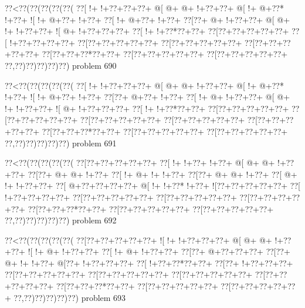 \vbox{\vbox{\goo
\0??<\0??(\0??(\0??(\0??(\0??(
\0??[\- !+\- !+\0??+\0??+\0??+
\- @[\- @+\- @+\- !+\0??+\0??+
\- @[\- !+\- @+\0??*\- !+\0??+
\- ![\- !+\- @+\0??+\- !+\0??+
\0??[\- !+\- @+\0??+\- !+\0??+
\0??[\0??+\- @+\- !+\0??+\0??+
\- @[\- @+\- !+\- !+\0??+\0??+
\- ![\- @+\- !+\0??+\0??+\0??+
\0??[\- !+\- !+\0??*\0??+\0??+
\0??[\0??+\0??+\0??+\0??+\0??+
\0??[\- !+\0??+\0??+\0??+\0??+
\0??[\0??+\0??+\0??+\0??+\0??+
\0??[\0??+\0??+\0??+\0??+\0??+
\0??[\0??+\0??+\0??+\0??+\0??+
\0??[\0??+\0??+\0??*\0??+\0??+
\0??[\0??+\0??+\0??+\0??+\0??+
\0??[\0??+\0??+\0??+\0??+\0??+
\0??,\0??)\0??)\0??)\0??)\0??)
}
\hfil problem 690\hfil\break
}

\vbox{\vbox{\goo
\0??<\0??(\0??(\0??(\0??(\0??(
\0??[\- !+\- !+\0??+\0??+\0??+
\- @[\- @+\- @+\- !+\0??+\0??+
\- @[\- !+\- @+\0??*\- !+\0??+
\- ![\- !+\- @+\0??+\- !+\0??+
\0??[\0??+\- @+\0??+\- !+\0??+
\0??[\- !+\- @+\- !+\0??+\0??+
\- @[\- @+\- !+\- !+\0??+\0??+
\- ![\- @+\- !+\0??+\0??+\0??+
\0??[\- !+\- !+\0??*\0??+\0??+
\0??[\0??+\0??+\0??+\0??+\0??+
\0??[\0??+\0??+\0??+\0??+\0??+
\0??[\0??+\0??+\0??+\0??+\0??+
\0??[\0??+\0??+\0??+\0??+\0??+
\0??[\0??+\0??+\0??+\0??+\0??+
\0??[\0??+\0??+\0??*\0??+\0??+
\0??[\0??+\0??+\0??+\0??+\0??+
\0??[\0??+\0??+\0??+\0??+\0??+
\0??,\0??)\0??)\0??)\0??)\0??)
}
\hfil problem 691\hfil\break
}

\vbox{\vbox{\goo
\0??<\0??(\0??(\0??(\0??(\0??(
\0??[\0??+\0??+\0??+\0??+\0??+
\0??[\- !+\- !+\0??+\- !+\0??+
\- @[\- @+\- @+\- !+\0??+\0??+
\0??[\0??+\- @+\- @+\- !+\0??+
\0??[\- !+\- @+\- !+\- !+\0??+
\0??[\0??+\- @+\- @+\- !+\0??+
\0??[\- @+\- !+\- !+\0??+\0??+
\0??[\- @+\0??+\0??+\0??+\0??+
\- @[\- !+\- !+\0??*\- !+\0??+
\- ![\0??+\0??+\0??+\0??+\0??+
\0??[\- !+\0??+\0??+\0??+\0??+
\0??[\0??+\0??+\0??+\0??+\0??+
\0??[\0??+\0??+\0??+\0??+\0??+
\0??[\0??+\0??+\0??+\0??+\0??+
\0??[\0??+\0??+\0??*\0??+\0??+
\0??[\0??+\0??+\0??+\0??+\0??+
\0??[\0??+\0??+\0??+\0??+\0??+
\0??,\0??)\0??)\0??)\0??)\0??)
}
\hfil problem 692\hfil\break
}

\vbox{\vbox{\goo
\0??<\0??(\0??(\0??(\0??(\0??(
\0??[\0??+\0??+\0??+\0??+\0??+
\- ![\- !+\- !+\0??+\0??+\0??+
\- @[\- @+\- @+\- !+\0??+\0??+
\- ![\- !+\- @+\- !+\0??+\0??+
\0??[\- !+\- @+\- !+\0??+\0??+
\0??[\0??+\- @+\0??+\0??+\0??+
\0??[\0??+\- @+\- !+\- !+\0??+
\- @[\0??+\- !+\0??+\0??+\0??+
\0??[\- !+\0??+\0??*\0??+\0??+
\0??[\0??+\- !+\0??+\0??+\0??+
\0??[\0??+\0??+\0??+\0??+\0??+
\0??[\0??+\0??+\0??+\0??+\0??+
\0??[\0??+\0??+\0??+\0??+\0??+
\0??[\0??+\0??+\0??+\0??+\0??+
\0??[\0??+\0??+\0??*\0??+\0??+
\0??[\0??+\0??+\0??+\0??+\0??+
\0??[\0??+\0??+\0??+\0??+\0??+
\0??,\0??)\0??)\0??)\0??)\0??)
}
\hfil problem 693\hfil\break
}

